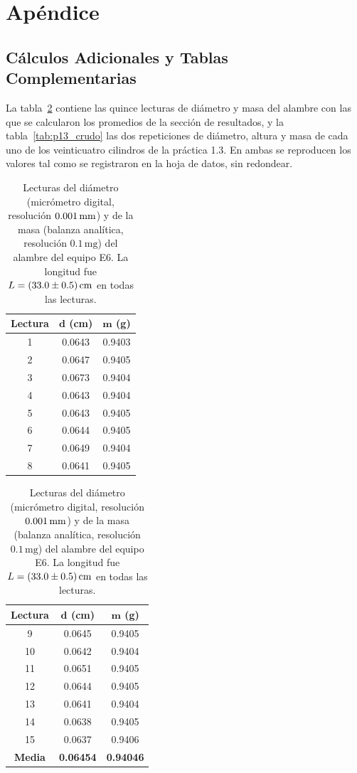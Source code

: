 \section{Apéndice}

\subsection{Cálculos Adicionales y Tablas Complementarias}

La tabla~\ref{tab:alambre_crudo} contiene las quince lecturas de diámetro y masa del alambre con las que se calcularon los promedios de la sección de resultados, y la tabla~\ref{tab:p13_crudo} las dos repeticiones de diámetro, altura y masa de cada uno de los veinticuatro cilindros de la práctica 1.3. En ambas se reproducen los valores tal como se registraron en la hoja de datos, sin redondear.

\begin{table}[H]
    \centering
    \caption{Lecturas del diámetro (micrómetro digital, resolución $0.001\,\mathrm{mm}$) y de la masa (balanza analítica, resolución $0.1\,\mathrm{mg}$) del alambre del equipo E6. La longitud fue $L = (33.0 \pm 0.5)\,\mathrm{cm}$ en todas las lecturas.}
    \label{tab:alambre_crudo}
    \begin{tabular}{c c c}
        \toprule
        \textbf{Lectura} & $\bm{d}$ (cm) & $\bm{m}$ (g) \\
        \midrule
        1  & 0.0643 & 0.9403 \\
        2  & 0.0647 & 0.9405 \\
        3  & 0.0673 & 0.9404 \\
        4  & 0.0643 & 0.9404 \\
        5  & 0.0643 & 0.9405 \\
        6  & 0.0644 & 0.9405 \\
        7  & 0.0649 & 0.9404 \\
        8  & 0.0641 & 0.9405 \\
        \bottomrule
    \end{tabular}
    \hspace{1.2cm}
    \begin{tabular}{c c c}
        \toprule
        \textbf{Lectura} & $\bm{d}$ (cm) & $\bm{m}$ (g) \\
        \midrule
        9  & 0.0645 & 0.9405 \\
        10 & 0.0642 & 0.9404 \\
        11 & 0.0651 & 0.9405 \\
        12 & 0.0644 & 0.9405 \\
        13 & 0.0641 & 0.9404 \\
        14 & 0.0638 & 0.9405 \\
        15 & 0.0637 & 0.9406 \\
        \textbf{Media} & \textbf{0.06454} & \textbf{0.94046} \\
        \bottomrule
    \end{tabular}
\end{table}

